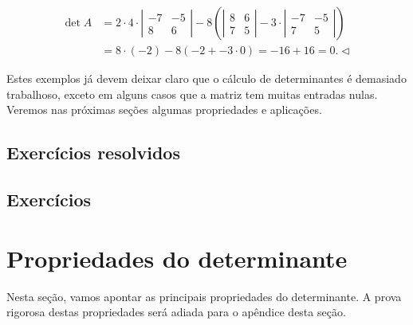 \begin{ex}
\begin{equation}
\begin{split}
\det A & = 2 \cdot 4 \cdot
\left|
\begin{matrix}
-7 & -5 \\
8 & 6
\end{matrix}
\right|  - 8 \left(  \left|
\begin{matrix}
8 & 6   \\
7 & 5
\end{matrix}
\right| - 3 \cdot
\left|
\begin{matrix}
-7 & -5   \\
7 & 5
\end{matrix}
\right|
\right) \\
     & = 8 \cdot (-2) - 8 (-2 + - 3 \cdot 0) = -16 + 16 = 0. \lhd
\end{split}
\end{equation}
\end{ex}

Estes exemplos já devem deixar claro que o cálculo de determinantes é demasiado trabalhoso, exceto em alguns casos que a matriz tem muitas entradas nulas. Veremos nas próximas seções algumas propriedades e aplicações.

\subsection*{Exercícios resolvidos}

\construirExeresol

\subsection*{Exercícios}

\construirExer

\section{Propriedades do determinante}

Nesta seção, vamos apontar as principais propriedades do determinante. A prova rigorosa destas propriedades será adiada para o apêndice desta seção.

